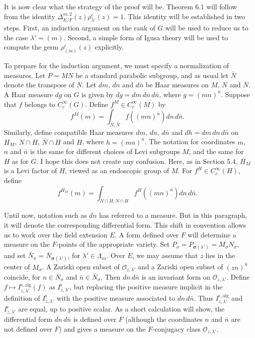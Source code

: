 \documentclass{amsart}
\begin{document}
It is now clear what the strategy of the proof will be.  Theorem 6.1 will follow from
the identity $\Delta^{m,2}_{E/F}(z)\rho^\epsilon_{\lambda'}(z)=1$.  This identity will
be established in two steps.  First, an induction argument on the rank of $G$  will be used to
reduce us to the case $\lambda'=(m)$.   Second, a simple form of Igusa theory
will be used to compute the germ $\rho^\epsilon_{(m)}(z)$ explicitly.

To prepare for the induction argument, we must specify a normalization
of measures.
Let $P=MN$ be a standard parabolic subgroup, and as usual let $\bar N$
denote the transpose of $N$.
Let $dm$, $dn$  and $d\bar n$ be Haar measures on $M$, $N$ and $\bar N$.
A Haar measure $dg$ on $G$ is given by $dg=dm\,dn\,d\bar n$, where $g = (mn)^{\bar n}$.
Suppose that $f$ belongs to $C_c^\infty(G)$.  Define $f^M\in C_c^\infty(M)$ by
$$f^M(m) = \int_{N,\bar N} f((mn)^{\bar n}) dn\,d\bar n.$$
Similarly, define compatible Haar measures $dm$, $dn$, $d\bar n$ and $dh = dm\,dn\,d\bar n$ on
$H_M$, $N\cap H$, $\bar N\cap H$ and $H$,
where $h=(mn)^{\bar n}$.  The notation for coordinates $m$, $n$ and $\bar n$
is the same for
different choices of Levi subgroups $M$, 
and the same for $H$ as for $G$.
I hope this does not create any confusion.
Here, as in Section 5.4, $H_M$ is a Levi factor of $H$, viewed as
an endoscopic group of $M$.
For $f^H\in C_c^\infty(H)$, define
$$f^{H_M}(m) = \int_{N\cap H,\bar N\cap H} f^H((mn)^{\bar n}) dn\,d\bar n.$$


Until now, notation such as $dn$ has referred to a measure.  But in
this paragraph, it will denote the corresponding differential form.
This shift in convention allows us to work over the field extension
$E$.  A form defined over $F$ will determine a measure on the
$F$-points of the appropriate variety.
Set $P_\sigma = P_{\pmb\sigma(\lambda')} = M_\sigma N_\sigma$, and set 
$\bar N_\sigma= \bar N_{\pmb\sigma(\lambda')}$, for 
$\lambda'\in \Lambda_m$.   
Over $E$, we may assume that $z$ lies in the center of $M_\sigma$.
A Zariski open subset of ${\mathcal O}_{z,\lambda'}$ and a Zariski open subset
of $(zn)^{\bar n}$ coincide, for $n\in N_\sigma$ and $\bar n\in \bar N_\sigma$.
Then $dn\,d\bar n$ is an invariant form on ${\mathcal O}_{z,\lambda'}$.
Define $f\mapsto I^{\epsilon,\text{alg}}_{z,\lambda'}(f)$ as $I^{\epsilon}_{z,\lambda'}$,
but replacing the positive measure implicit in the definition of $I^{\epsilon}_{z,\lambda'}$
with the positive measure associated to $dn\,d\bar n$.  
Thus $I^{\epsilon,\text{alg}}_{z,\lambda'}$
and $I^\epsilon_{z,\lambda'}$ are equal, up to positive scalar.
As a short calculation will show, the differential form $dn\,d\bar n$ 
is defined over $F$
(although the coordinates
$n$ and $\bar n$ are not defined over $F$)
and gives a measure on the $F$-conjugacy class ${\mathcal O}_{z,\lambda'}$.
\end{document}
